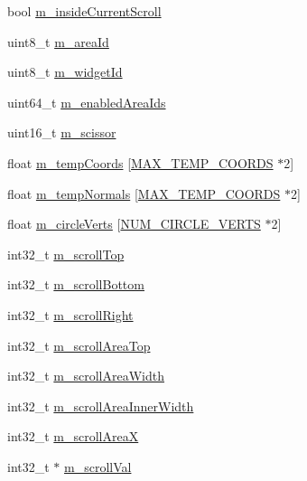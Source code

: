 \begin{DoxyCompactItemize}
\item 
bool \hyperlink{struct_imgui_a361e294d6cab2d03e761c81a55f3ab3a}{m\+\_\+inside\+Current\+Scroll}
\item 
uint8\+\_\+t \hyperlink{struct_imgui_a49f3ba72d556e833159d3c53055e7ac5}{m\+\_\+area\+Id}
\item 
uint8\+\_\+t \hyperlink{struct_imgui_ab53ae39e3d5f0b9e95c40ed5f6167f2c}{m\+\_\+widget\+Id}
\item 
uint64\+\_\+t \hyperlink{struct_imgui_acbbe53140f85331b41d31dccd4b75c9e}{m\+\_\+enabled\+Area\+Ids}
\item 
uint16\+\_\+t \hyperlink{struct_imgui_a2dcf14acfafc445b001d77eb33c65730}{m\+\_\+scissor}
\item 
float \hyperlink{struct_imgui_aa3b9f011f9b3de1ca858e33207a4b833}{m\+\_\+temp\+Coords} \mbox{[}\hyperlink{imgui_8cpp_ac8b912735d9c4520ca6cb8fde885a56f}{M\+A\+X\+\_\+\+T\+E\+M\+P\+\_\+\+C\+O\+O\+R\+D\+S} $\ast$2\mbox{]}
\item 
float \hyperlink{struct_imgui_a19066c64797331e561d4777a255ba382}{m\+\_\+temp\+Normals} \mbox{[}\hyperlink{imgui_8cpp_ac8b912735d9c4520ca6cb8fde885a56f}{M\+A\+X\+\_\+\+T\+E\+M\+P\+\_\+\+C\+O\+O\+R\+D\+S} $\ast$2\mbox{]}
\item 
float \hyperlink{struct_imgui_ab3588c2ae89dd63593b4b1e3c8de8d6a}{m\+\_\+circle\+Verts} \mbox{[}\hyperlink{imgui_8cpp_a3ab40b25c7d9283ac2c0cf0f591ee58f}{N\+U\+M\+\_\+\+C\+I\+R\+C\+L\+E\+\_\+\+V\+E\+R\+T\+S} $\ast$2\mbox{]}
\item 
int32\+\_\+t \hyperlink{struct_imgui_a8ea061e73972317ffdbae708cfea6acc}{m\+\_\+scroll\+Top}
\item 
int32\+\_\+t \hyperlink{struct_imgui_a5f91076681b523cf51371482b60c89cb}{m\+\_\+scroll\+Bottom}
\item 
int32\+\_\+t \hyperlink{struct_imgui_a05c7c15bafb234b3aa31dc8ef87cca90}{m\+\_\+scroll\+Right}
\item 
int32\+\_\+t \hyperlink{struct_imgui_aaa84d2ed9b429ebc8465793af4a69423}{m\+\_\+scroll\+Area\+Top}
\item 
int32\+\_\+t \hyperlink{struct_imgui_abb0e9f220b5bd0d58c9042531deb009d}{m\+\_\+scroll\+Area\+Width}
\item 
int32\+\_\+t \hyperlink{struct_imgui_a82f08746442ad6d35d5a9916dad376e9}{m\+\_\+scroll\+Area\+Inner\+Width}
\item 
int32\+\_\+t \hyperlink{struct_imgui_a556405944c01311715fc025bf22e69c8}{m\+\_\+scroll\+Area\+X}
\item 
int32\+\_\+t $\ast$ \hyperlink{struct_imgui_ace428922eb784a2e660c1db562ee39bc}{m\+\_\+scroll\+Val}

\end{DoxyCompactItemize}
